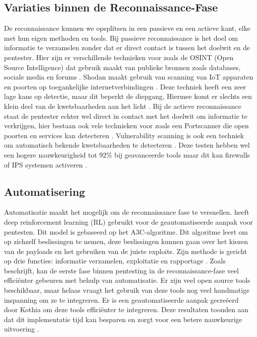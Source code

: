 \subsection{Variaties binnen de Reconnaissance-Fase}
De reconnaissance kunnen we opsplitsen in een passieve en een actieve kant, elke met hun eigen methoden en tools. 
Bij passieve reconnaissance is het doel om informatie te verzamelen zonder dat er direct contact is tussen het doelwit en de pentester.
Hier zijn er verschillende technieken voor zoals de OSINT (Open Source Intelligence) dat gebruik maakt van publieke bronnen zoals databases, sociale media en forums \autocite{Dalalana2017}. 
Shodan maakt gebruik van scanning van IoT apparaten en poorten op toegankelijke internetverbindingen \autocite{Monero2025}.
Deze techniek heeft een zeer lage kans op detectie, maar dit beperkt de diepgang, Hiermee komt er slechts een klein deel van de kwetsbaarheden aan het licht \parencite{ANDRESS2014}.
Bij de actieve reconnaissance staat de pentester echter wel direct in contact met het doelwit om informatie te verkrijgen, hier bestaan ook vele technieken voor zoals een Portscanner die open poorten en services kan detecteren \autocite{Monero2025}. 
Vulnerability scanning is ook een techniek om automatisch bekende kwetsbaarheden te detecteren \autocite{GOEL2015}. 
Deze testen hebben wel een hogere nauwkeurigheid tot 92\% bij geavanceerde tools maar dit kan firewalls of IPS systemen activeren \parencite{Li2022}.

\subsection{Automatisering}
Automatisatie maakt het mogelijk om de reconnaissance fase te versnellen. 
\textcite{Hoang} heeft deep reinforcement learning (RL) gebruikt voor de geautomatiseerde aanpak voor pentesten. 
Dit model is gebaseerd op het A3C-algoritme. Dit algoritme leert om op zichzelf beslissingen te nemen, deze beslissingen kunnen gaan over het kiezen van de payloads en het gebruiken van de juiste exploits. 
Zijn methode is gericht op drie functies: informatie verzamelen, exploitatie en rapportage \autocite{Hoang}.
Zoals \textcite{Kothia} beschrijft, kan de eerste fase binnen pentesting in de reconnaissance-fase veel efficiënter gebeuren met behulp van automatisatie. 
Er zijn veel open source tools beschikbaar, maar helaas vraagt het gebruik van deze tools nog veel handmatige inspanning om ze te integreren.
Er is een geautomatiseerde aanpak gecreëerd door Kothia om deze tools efficiënter te integreren. 
Deze resultaten toonden aan dat dit implementatie tijd kan besparen en zorgt voor een betere nauwkeurige uitvoering \parencite{Kothia}.

